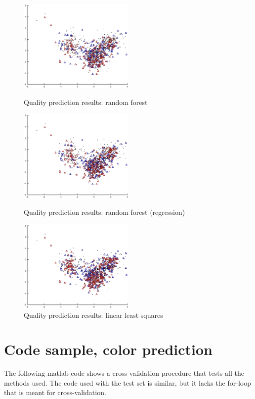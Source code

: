 \documentclass[twoside]{article}
\begin{document}
\begin{multicols}{2}
\begin{figure}[H]
\centering
\includegraphics[width=0.5\textwidth]{rankpca/randomforest}
\caption{Quality prediction results: random forest}
\includegraphics[width=0.5\textwidth]{rankpca/randomforestreg}
\caption{Quality prediction results: random forest (regression)}
\includegraphics[width=0.5\textwidth]{rankpca/ols}
\caption{Quality prediction results: linear least squares}
\end{figure}


\section{Code sample, color prediction}\label{appendix:colorcode}

The following matlab code shows a cross-validation procedure
that tests all the methods used. The code used with the test
set is similar, but it lacks the for-loop that is meant for 
cross-validation.


\end{multicols}
\end{document}
